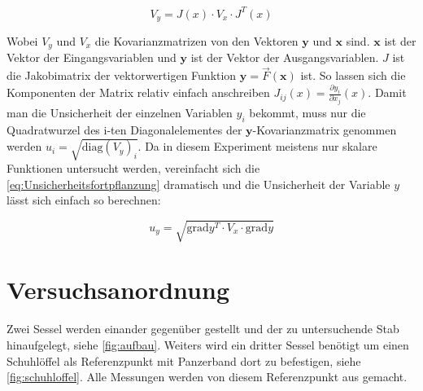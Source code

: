 \documentclass[11pt,ngerman]{scrartcl}
\begin{document}
\begin{equation}
	\label{eq:Unsicherheitsfortpflanzung}
	V_y = J(x) \cdot V_x \cdot J^{T}(x)
\end{equation}

Wobei $V_y$ und $V_x$ die Kovarianzmatrizen von den Vektoren $\bm{y}$ und $\bm{x}$ sind.
$\bm{x}$ ist der Vektor der Eingangsvariablen und $\bm{y}$ ist der Vektor der Ausgangsvariablen.
$J$ ist die Jakobimatrix der vektorwertigen Funktion $\bm{y} = \vec{F}(\bm{x})$ ist.
So lassen sich die Komponenten der Matrix relativ einfach anschreiben $J_{ij}(x) = \frac{\partial{y_i}}{\partial{x_j}}(x)$.
Damit man die Unsicherheit der einzelnen Variablen $y_i$ bekommt, muss nur die Quadratwurzel des i-ten Diagonalelementes der
$\bm{y}$-Kovarianzmatrix genommen werden $u_i= \sqrt{\mathrm{diag}(V_y)_i}$.
Da in diesem Experiment meistens nur skalare Funktionen untersucht werden, vereinfacht
sich die \autoref{eq:Unsicherheitsfortpflanzung} dramatisch und die Unsicherheit
der Variable $y$ lässt sich einfach so berechnen:

\begin{equation}
	\label{eq:graduncentainty}
	u_y = \sqrt{\mathrm{grad} y^T \cdot V_x \cdot \mathrm{grad} y}
\end{equation}

\section{Versuchsanordnung}
\label{sec:versuchsanordnung}
Zwei Sessel werden einander gegenüber gestellt und der zu untersuchende Stab
hinaufgelegt, siehe \autoref{fig:aufbau}. Weiters wird ein dritter Sessel
benötigt um einen Schuhlöffel als Referenzpunkt mit
Panzerband dort zu befestigen, siehe
\autoref{fig:schuhloffel}. Alle Messungen werden von diesem Referenzpunkt aus
gemacht.
\end{document}
